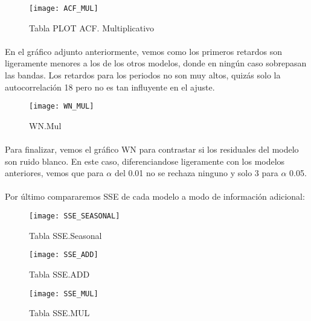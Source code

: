 \documentclass[a4paper, spanish]{article}
\begin{document}
      \begin{figure}[h]
        \centering
        \texttt{[image: ACF\_MUL]}
        \caption{Tabla PLOT ACF. Multiplicativo}
        \label{}
      \end{figure}

      \paragraph{}
      En el gráfico adjunto anteriormente, vemos como los primeros retardos son ligeramente menores a los de los otros modelos, donde en ningún caso sobrepasan las bandas. Los retardos para los periodos no son muy altos, quizás solo la autocorrelación 18 pero no es tan influyente en el ajuste.

      \begin{figure}[h]
        \centering
        \texttt{[image: WN\_MUL]}
        \caption{WN.Mul}
        \label{}
      \end{figure}

      \paragraph{}
      Para finalizar, vemos el gráfico WN para contrastar si los residuales del modelo son ruido blanco. En este caso, diferenciandose ligeramente con los modelos anteriores, vemos que para $\alpha$ del 0.01 no se rechaza ninguno y solo 3 para $\alpha$ 0.05.

      \paragraph{}
      Por último compararemos SSE de cada modelo a modo de información adicional:

      \begin{figure}[h]
        \centering
        \texttt{[image: SSE\_SEASONAL]}
        \caption{Tabla SSE.Seasonal}
        \label{}
      \end{figure}

      \begin{figure}[h]
        \centering
        \texttt{[image: SSE\_ADD]}
        \caption{Tabla SSE.ADD}
        \label{}
      \end{figure}

      \begin{figure}[h]
        \centering
        \texttt{[image: SSE\_MUL]}
        \caption{Tabla SSE.MUL}
        \label{}
      \end{figure}
\end{document}
